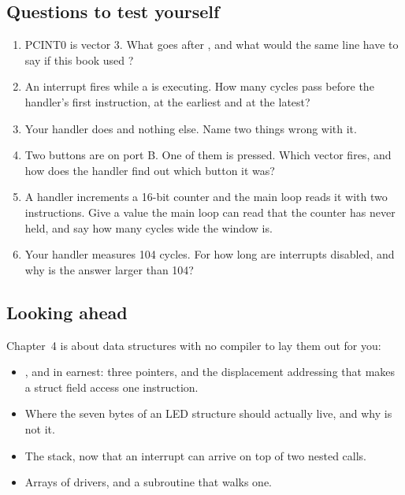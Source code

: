 \subsection*{Questions to test yourself}
\begin{enumerate}
  \item PCINT0 is vector 3. What goes after , and what would the same line have to say
    if this book used ?
  \item An interrupt fires while a  is executing. How many cycles pass before the
    handler's first instruction, at the earliest and at the latest?
  \item Your handler does  and nothing else. Name two things wrong with it.
  \item Two buttons are on port B. One of them is pressed. Which vector fires, and how does the
    handler find out which button it was?
  \item A handler increments a 16-bit counter and the main loop reads it with two 
    instructions. Give a value the main loop can read that the counter has never held, and say how
    many cycles wide the window is.
  \item Your handler measures 104 cycles. For how long are interrupts disabled, and why is the
    answer larger than 104?
\end{enumerate}

\subsection*{Looking ahead}
Chapter~4 is about data structures with no compiler to lay them out for you:
\begin{itemize}
  \item {},  and  in earnest: three pointers, and the displacement
    addressing that makes a struct field access one instruction.
  \item Where the seven bytes of an LED structure should actually live, and why
     is not it.
  \item The stack, now that an interrupt can arrive on top of two nested calls.
  \item Arrays of drivers, and a subroutine that walks one.
\end{itemize}
